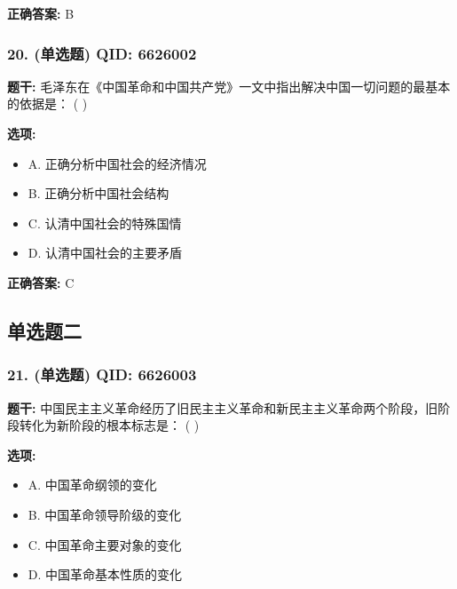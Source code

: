 \documentclass[12pt,UTF8]{ctexart}
\begin{document}
\textbf{正确答案:}
B

\vspace{0.3em}\hrulefill\vspace{0.7em}

\subsubsection*{20. (单选题) \small QID: 6626002}

\textbf{题干:}
毛泽东在《中国革命和中国共产党》一文中指出解决中国一切问题的最基本的依据是： ( )

\textbf{选项:}
\begin{itemize}[leftmargin=*]

  \item A. 正确分析中国社会的经济情况

  \item B. 正确分析中国社会结构

  \item C. 认清中国社会的特殊国情

  \item D. 认清中国社会的主要矛盾

\end{itemize}

\textbf{正确答案:}
C

\vspace{0.3em}\hrulefill\vspace{0.7em}

\subsection*{单选题二}

\subsubsection*{21. (单选题) \small QID: 6626003}

\textbf{题干:}
中国民主主义革命经历了旧民主主义革命和新民主主义革命两个阶段，旧阶段转化为新阶段的根本标志是： ( )

\textbf{选项:}
\begin{itemize}[leftmargin=*]

  \item A. 中国革命纲领的变化

  \item B. 中国革命领导阶级的变化

  \item C. 中国革命主要对象的变化

  \item D. 中国革命基本性质的变化

\end{itemize}
\end{document}
